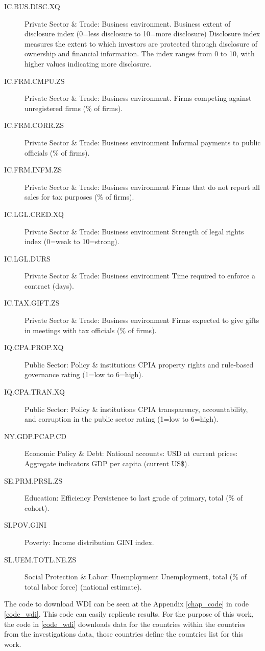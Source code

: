\begin{description}
\item[IC.BUS.DISC.XQ]	Private Sector \& Trade: Business environment. Business extent of disclosure index (0=less disclosure to 10=more disclosure)	Disclosure index measures the extent to which investors are protected through disclosure of ownership and financial information. The index ranges from 0 to 10, with higher values indicating more disclosure.
\item[IC.FRM.CMPU.ZS]	Private Sector \& Trade: Business environment. Firms competing against unregistered firms (\% of firms).
\item[IC.FRM.CORR.ZS]	Private Sector \& Trade: Business environment	Informal payments to public officials (\% of firms).
\item[IC.FRM.INFM.ZS]	Private Sector \& Trade: Business environment	Firms that do not report all sales for tax purposes (\% of firms).
\item[IC.LGL.CRED.XQ]	Private Sector \& Trade: Business environment	Strength of legal rights index (0=weak to 10=strong).
\item[IC.LGL.DURS]	Private Sector \& Trade: Business environment	Time required to enforce a contract (days).
\item[IC.TAX.GIFT.ZS]	Private Sector \& Trade: Business environment	Firms expected to give gifts in meetings with tax officials (\% of firms).
\item[IQ.CPA.PROP.XQ]	Public Sector: Policy \& institutions	CPIA property rights and rule-based governance rating (1=low to 6=high).
\item[IQ.CPA.TRAN.XQ]	Public Sector: Policy \& institutions	CPIA transparency, accountability, and corruption in the public sector rating (1=low to 6=high).
\item[NY.GDP.PCAP.CD]	Economic Policy \& Debt: National accounts: USD at current prices: Aggregate indicators	GDP per capita (current US\$).
\item[SE.PRM.PRSL.ZS]	Education: Efficiency	Persistence to last grade of primary, total (\% of cohort).
\item[SI.POV.GINI]	Poverty: Income distribution GINI index.
\item[SL.UEM.TOTL.NE.ZS]	Social Protection \& Labor: Unemployment	Unemployment, total (\% of total labor force) (national estimate).
\end{description}

The code to download WDI can be seen at the Appendix \ref{chap_code} in code \ref{code_wdi}. This code can easily replicate results. For the purpose of this work, the code in \ref{code_wdi} downloads data for the countries within the countries from the investigations data, those countries define the countries list for this work.

